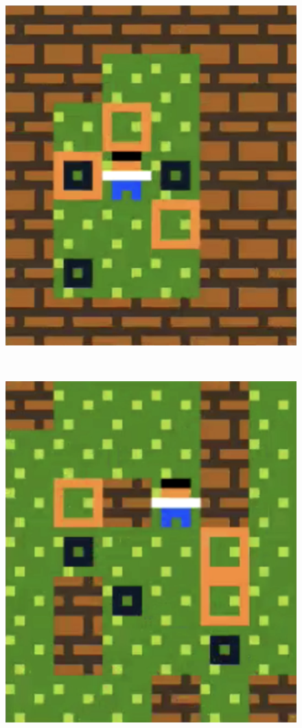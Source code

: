\begin{figure}[!htbp]
\begin{minipage}[t]{0.2\textwidth}
\end{minipage}
$\:$
\begin{minipage}[t]{0.2\textwidth}
\includegraphics[width=\textwidth]{figures/finaldesign3_2.png} \hfill \\
\end{minipage}
$\:$
\begin{minipage}[t]{0.2\textwidth}
\includegraphics[width=\textwidth]{figures/finaldesign3_3.png} \hfill \\

\end{minipage}
\end{figure}
